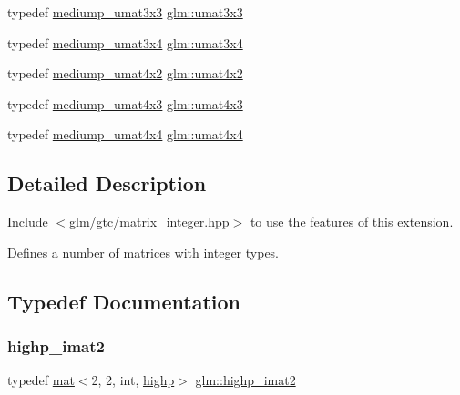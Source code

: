 \begin{DoxyCompactItemize}
\item 
typedef \hyperlink{group__gtc__matrix__integer_gac2563a9d45e3f6be0ceaf62b50a983f5}{mediump\+\_\+umat3x3} \hyperlink{group__gtc__matrix__integer_gab80b6501ba1b2c40119a0f2d256f4c97}{glm\+::umat3x3}
\item 
typedef \hyperlink{group__gtc__matrix__integer_ga22e32b4dcd60655044ebbd30f50a2e67}{mediump\+\_\+umat3x4} \hyperlink{group__gtc__matrix__integer_ga5410857d098a989a30b4017100bc2ff7}{glm\+::umat3x4}
\item 
typedef \hyperlink{group__gtc__matrix__integer_gaf44e145efd637df6f2a300f968ebb51f}{mediump\+\_\+umat4x2} \hyperlink{group__gtc__matrix__integer_ga13e8392218e9b6e1b7f194a21b5c88bf}{glm\+::umat4x2}
\item 
typedef \hyperlink{group__gtc__matrix__integer_ga974bc32af0686378c4696208c3103d96}{mediump\+\_\+umat4x3} \hyperlink{group__gtc__matrix__integer_ga08373f5588a54da1a48e5e55c7d51004}{glm\+::umat4x3}
\item 
typedef \hyperlink{group__gtc__matrix__integer_ga0dcca70aa643639489cf52acf7574e6c}{mediump\+\_\+umat4x4} \hyperlink{group__gtc__matrix__integer_gae0931b79e808fb0983848778a60eb548}{glm\+::umat4x4}
\end{DoxyCompactItemize}


\subsection{Detailed Description}
Include $<$\hyperlink{matrix__integer_8hpp}{glm/gtc/matrix\+\_\+integer.\+hpp}$>$ to use the features of this extension.

Defines a number of matrices with integer types. 

\subsection{Typedef Documentation}
\mbox{\label{group__gtc__matrix__integer_ga5b3d41917c60488d2babd72ca26d01ba}} 
\subsubsection{\texorpdfstring{highp\+\_\+imat2}{highp\_imat2}}
{\footnotesize\ttfamily typedef \hyperlink{structglm_1_1mat}{mat}$<$2, 2, int, \hyperlink{namespaceglm_a36ed105b07c7746804d7fdc7cc90ff25ac6f7eab42eacbb10d59a58e95e362074}{highp}$>$ \hyperlink{group__gtc__matrix__integer_ga5b3d41917c60488d2babd72ca26d01ba}{glm\+::highp\+\_\+imat2}}

